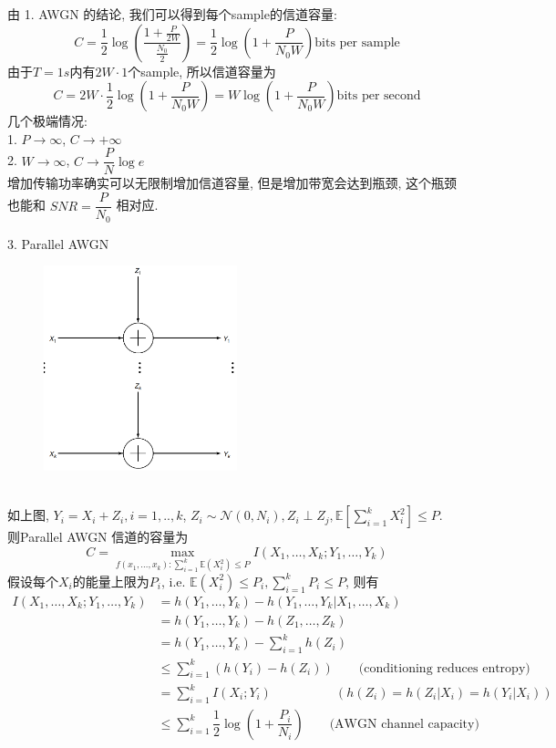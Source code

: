 由 1. AWGN 的结论, 我们可以得到每个sample的信道容量:
$$C=\dfrac{1}{2}\log\left(\dfrac{1+\frac{P}{2W}}{\frac{N_0}{2}}\right)=\dfrac{1}{2}\log\left(1+\dfrac{P}{N_0W}\right) \text{bits per sample}$$
由于$T=1s$内有$2W\cdot 1$个sample, 所以信道容量为
$$C=2W\cdot\dfrac{1}{2}\log\left(1+\dfrac{P}{N_0W}\right)=W\log\left(1+\dfrac{P}{N_0W}\right) \text{bits per second}$$
几个极端情况: \\
1. $P\to \infty$, $C\to +\infty$ \\
2. $W\to \infty$, $C\to \dfrac{P}{N}\log e$ \\
增加传输功率确实可以无限制增加信道容量, 但是增加带宽会达到瓶颈, 这个瓶颈也能和 $SNR=\dfrac{P}{N_0}$ 相对应.

3. Parallel AWGN
\begin{figure}[htbp]
    \centering
    \includegraphics[width=0.5\textwidth]{./figures/chapter7/parallel_Gaussian_channel.png}
\end{figure} \\
如上图, $Y_i=X_i+Z_i, i=1,..,k$, $Z_i\sim \mathcal{N}(0,N_i), Z_i\perp Z_j, \mathbb{E}\left[\sum\limits_{i=1}^k X_i^2\right]\leq P$. \\
则Parallel AWGN 信道的容量为
$$C=\max_{f(x_1,\ldots,x_k):\sum\limits_{i=1}^k \mathbb{E}(X_i^2)\leq P} I(X_1,\ldots,X_k;Y_1,\ldots,Y_k)$$
假设每个$X_i$的能量上限为$P_i$, i.e. $\mathbb{E}(X_i^2)\leq P_i, \sum\limits_{i=1}^k P_i\leq P$, 则有
\begin{align*}
I(X_1,\ldots,X_k;Y_1,\ldots,Y_k) &= h(Y_1,\ldots,Y_k) - h(Y_1,\ldots,Y_k|X_1,\ldots,X_k) \\
&= h(Y_1,\ldots,Y_k) - h(Z_1,\ldots,Z_k) \\
&= h(Y_1,\ldots,Y_k) - \sum_{i=1}^k h(Z_i) \\
&\leq \sum_{i=1}^k \left(h(Y_i) - h(Z_i)\right) \qquad \text{(conditioning reduces entropy)} \\
&= \sum_{i=1}^k I(X_i;Y_i) \qquad\qquad\quad (h(Z_i)=h(Z_i|X_i)=h(Y_i|X_i)) \\
&\leq \sum_{i=1}^k \dfrac{1}{2}\log\left(1+\dfrac{P_i}{N_i}\right) \qquad \text{(AWGN channel capacity)}
\end{align*}
